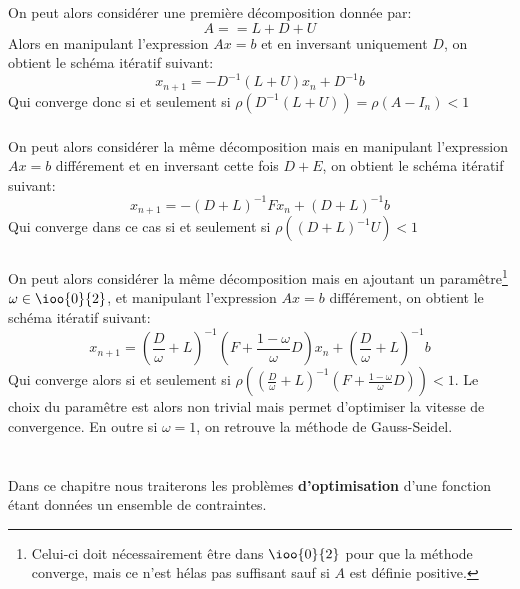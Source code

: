 \subsection*{}
On peut alors considérer une première décomposition donnée par:
\[ 
   A = = L + D + U 
\]
Alors en manipulant l'expression \( Ax = b \) et en inversant uniquement \( D \), on obtient le schéma itératif suivant:
\[ 
   x_{n+1} = - D^{-1}(L + U)x_n + D^{-1}b 
\]
Qui converge donc si et seulement si \( \rho(D^{-1}(L + U)) = \rho(A - I_n) < 1 \)
\subsection*{}
On peut alors considérer la même décomposition mais en manipulant l'expression \( Ax = b \) différement et en inversant cette fois \( D + E \), on obtient le schéma itératif suivant:
\[ 
   x_{n+1} = -(D + L)^{-1}Fx_n + (D + L)^{-1}b 
\]
Qui converge dans ce cas si et seulement si \( \rho((D + L)^{-1}U) < 1 \)
\subsection*{}
On peut alors considérer la même décomposition mais en ajoutant un paramêtre\footnote[1]{Celui-ci doit nécessairement être dans \( \ioo{0}{2} \) pour que la méthode converge, mais ce n'est hélas pas suffisant sauf si \( A \) est définie positive.} \( \omega \in \ioo{0}{2} \), et manipulant l'expression \( Ax = b \) différement, on obtient le schéma itératif suivant:
\[ 
   x_{n+1} = \left (\frac{D}{ \omega} + L \right )^{-1} \left(F + \frac{1 - \omega}{ \omega}D \right)x_n + \left(\frac{D}{ \omega} + L \right)^{-1}b 
\]
Qui converge alors si et seulement si \( \rho((\frac{D}{ \omega} + L)^{-1}(F + \frac{1 - \omega}{ \omega}D)) < 1 \). Le choix du paramêtre est alors non trivial mais permet d'optimiser la vitesse de convergence. En outre si \( \omega = 1 \), on retrouve la méthode de Gauss-Seidel.
\chapter*{}
Dans ce chapitre nous traiterons les problèmes \textbf{d'optimisation} d'une fonction étant données un ensemble de contraintes.\<

